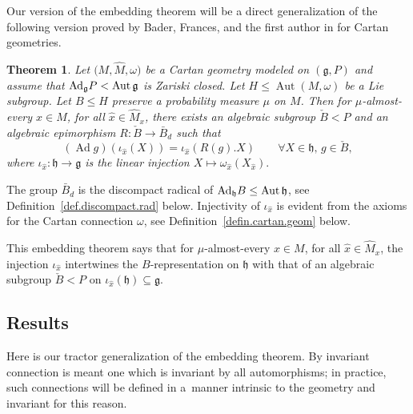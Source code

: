 \documentclass[pdftex]{sigma}
\numberwithin{equation}{section}
\newtheorem{thm}{Theorem}[section]
\theoremstyle{definition}
\newcommand{\lieg}{\mathfrak{g}}
\newcommand{\lieh}{\mathfrak{h}}
\newcommand{\Ad}{\operatorname{Ad}}
\begin{document}
Our version of the embedding theorem will be a direct generalization of the following version proved by Bader, Frances, and the first author in \cite[Theorems~1.2 and 4.1]{bfm.zimemb} for Cartan geometries.

\begin{thm}%
Let $\bigl(M, \hat{M}, \omega\bigr)$ be a Cartan geometry modeled on $(\lieg,P)$ and assume that ${\rm Ad}_{\lieg} P<\operatorname{Aut} \lieg$ is Zariski closed. Let $H\leq\operatorname{Aut}(M,\omega)$ be a Lie subgroup. Let $B \leq H$ preserve a probability measure $\mu$ on $M$. Then for $\mu$-almost-every $x\in M$, for all $\hat x\in\hat M_x$, there exists an algebraic subgroup $\check B<P$ and an algebraic epimorphism
$R\colon \check{B} \rightarrow \bar{B}_d$ such that
\[ (\Ad g) (\iota_{\hat{x}} (X)) = \iota_{\hat{x}} ( R(g). X ) \qquad \forall X \in \mathcal{\lieh},\, g \in \check{B},\]
where $\iota_{\hat{x}} \colon \lieh \rightarrow \lieg$ is the linear injection $X \mapsto \omega_{\hat{x}}(X_{\hat{x}}).$
\end{thm}
\noindent The group $\bar{B}_d$ is the discompact radical of ${\rm Ad}_{\lieh} B \leq \operatorname{Aut} \lieh$, see Definition~\ref{def.discompact.rad} below. Injectivity of $\iota_{\hat{x}}$ is evident from the axioms for the Cartan connection $\omega$, see Definition~\ref{defin.cartan.geom} below.


This embedding theorem says that for $\mu$-almost-every $x \in M$, for all $\hat{x} \in \hat{M}_x$, the injection $\iota_{\hat{x}}$ intertwines the $B$-representation on $\lieh$ with that of an algebraic subgroup $\check{B} < P$ on $\iota_{\hat{x}}(\lieh) \subseteq \lieg$.

\subsection{Results}

Here is our tractor generalization of the embedding theorem. By invariant connection is meant one which is invariant by all automorphisms; in practice, such connections will be defined in a~manner intrinsic to the geometry and invariant for this reason.
\end{document}
